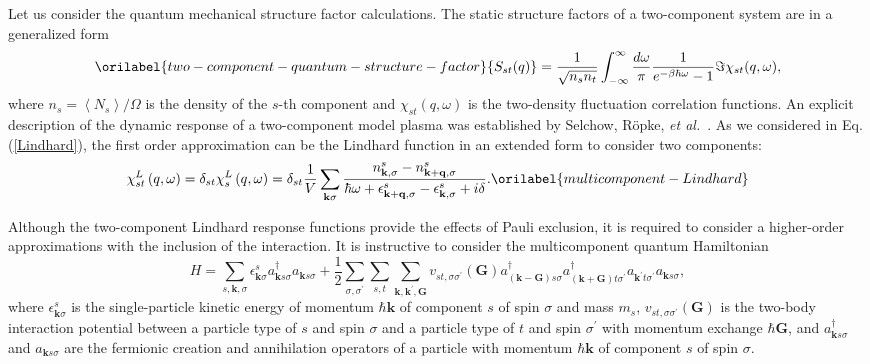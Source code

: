 \documentclass[aps,showkeys,noshowpacs,superscriptaddress,pre,preprint]{revtex4-2}
\let\label\orilabel
\begin{document}
Let us consider the quantum mechanical structure factor calculations.
The static structure factors of a two-component system are in a generalized form~\cite{Kremp2010}
\begin{equation}
\label{two-component-quantum-structure-factor}
{S_{st} (q)} = \frac{1}{\sqrt{n_s n_t}} \int_{-\infty}^{\infty} \frac{d\omega}{\pi} \frac{1}{e^{-\beta\hbar\omega} - 1} {\Im {\chi_{st}} ( q, \omega )} ,
\end{equation}
where $n_s = {\left\langle N_s \right\rangle} / \Omega$ is the density of the $s$-th component
and ${{\chi_{st}} ( q, \omega )}$ is the two-density fluctuation correlation functions.
An explicit description of the dynamic response of a two-component model plasma 
was established by Selchow, R\"opke, \textit{et al.}~\cite{Selchow2001}.
As we considered in Eq. (\ref{Lindhard}), the first order approximation can be the Lindhard function
in an extended form to consider two components:
\begin{equation}
{\chi^L_{st} \left( q, \omega \right)} = 
\delta_{st} {\chi^L_{s} \left( q, \omega \right)} =
\delta_{st} \frac{1}{V}
\sum_{\mathbf{k} \sigma} \frac{n^s_{\mathbf{k}, \sigma} - n^s_{\mathbf{k}+\mathbf{q}, \sigma}}{
\hbar\omega + \epsilon^s_{\mathbf{k}+\mathbf{q}, \sigma} - \epsilon^s_{\mathbf{k}, \sigma}
+ i \delta } .
\label{multicomponent-Lindhard}
\end{equation}

Although the two-component Lindhard response functions provide the effects of Pauli exclusion,
it is required to consider a higher-order approximations with the inclusion of the interaction.
It is instructive to consider the multicomponent quantum Hamiltonian
\begin{equation}
H = \sum_{s,\mathbf{k},\sigma} \epsilon^s_{\mathbf{k} \sigma} a^\dag_{\mathbf{k} s \sigma} a_{\mathbf{k} s \sigma}
+ \frac{1}{2} \sum_{\sigma, \sigma^\prime} \sum_{s, t} \sum_{\mathbf{k}, \mathbf{k}^\prime, \mathbf{G}}
v_{s t, \sigma \sigma^\prime} \left( \mathbf{G} \right) 
a^\dag_{\left( \mathbf{k} - \mathbf{G} \right) s \sigma} a^\dag_{\left( \mathbf{k} + \mathbf{G} \right) t \sigma^\prime}
a_{\mathbf{k}^\prime t \sigma^\prime} a_{\mathbf{k} s \sigma},
\end{equation}
where $\epsilon^s_{\mathbf{k} \sigma}$ is the single-particle kinetic energy of momentum $\hbar \mathbf{k}$
of component $s$ of spin $\sigma$ and mass $m_s$,
$v_{s t, \sigma \sigma^\prime} \left( \mathbf{G} \right)$ is the two-body interaction potential between a particle type of $s$ and spin $\sigma$
and a particle type of $t$ and spin $\sigma^\prime$ with momentum exchange $\hbar \mathbf{G}$,
and $a^\dag_{\mathbf{k} s \sigma}$ and $a_{\mathbf{k} s \sigma}$
are the fermionic creation and annihilation operators of a particle with momentum $\hbar \mathbf{k}$
of component $s$ of spin $\sigma$.
\end{document}
